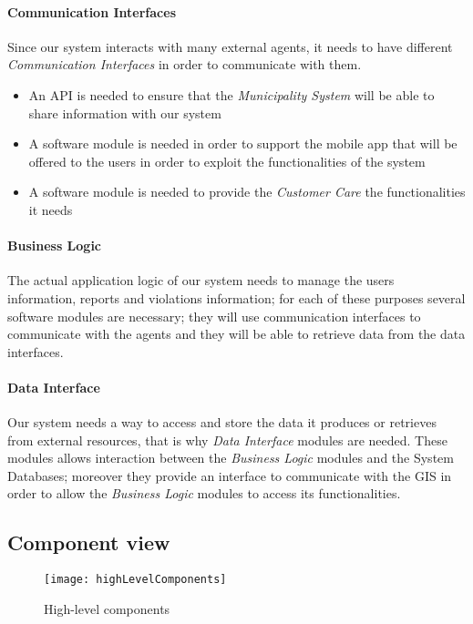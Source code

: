		\paragraph{Communication Interfaces}
			Since our system interacts with many external agents, it needs to have different \emph{Communication Interfaces} in order to communicate with them. 
		\begin{itemize}
			\item An API is needed to ensure that the \emph{Municipality System} will be able to share information with our system
			\item A software module is needed in order to support the mobile app that will be offered to the users in order to exploit the functionalities of the system 
			\item A software module is needed to provide the \emph{Customer Care} the functionalities it needs
		\end{itemize}

		\paragraph{Business Logic}
			The actual application logic of our system needs to manage the users information, reports and violations information; for each of these purposes several software modules are necessary; they will use communication interfaces to communicate with the agents and they will be able to retrieve data from the data interfaces.
		\paragraph{Data Interface}
			Our system needs a way to access and store the data it produces or retrieves from external resources, that is why \emph{Data Interface} modules are needed. These modules allows interaction between the \emph{Business Logic} modules and the System Databases; moreover they provide an interface to communicate with the GIS in order to allow the \emph{Business Logic} modules to access its functionalities.

\clearpage

\subsection{Component view}
\begin{figure}[h]
	\centering
	\texttt{[image: highLevelComponents]}
	\caption{
		\label{fig:highLevelComponents} 
		High-level components
	}
\end{figure}

